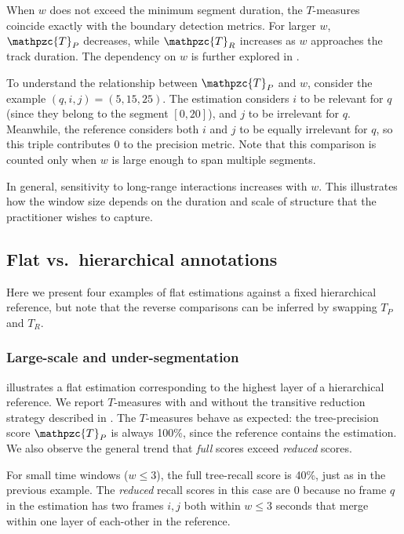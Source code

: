 \documentclass{article}
\def\shag{\ensuremath{\mathpzc{T}}}
\begin{document}
When $w$ does not exceed the minimum segment duration, the $T$-measures coincide
exactly with the boundary detection metrics.
For larger $w$, $\shag_P$ decreases, while $\shag_R$ increases as $w$ approaches the track
duration.
The dependency on $w$ is further explored in .

To understand the relationship between $\shag_P$ and $w$, consider the example 
$(q,i,j) = (5,15,25)$.
The estimation considers $i$ to be relevant for $q$ (since they belong to the segment $[0, 20]$), 
and $j$ to be irrelevant for $q$. Meanwhile, the reference considers both $i$
and $j$ to be equally irrelevant for $q$, so this triple contributes 0 to the precision
metric.
Note that this comparison is counted only when $w$ is large enough to span multiple
segments.

In general, sensitivity to long-range interactions increases with $w$.
This illustrates how the window size depends on the duration and scale of structure
that the practitioner wishes to capture.

\subsection{Flat vs.\ hierarchical annotations}

Here we present four examples of flat estimations against a fixed hierarchical reference, but note that the
reverse comparisons can be inferred by swapping $T_P$ and $T_R$.

\subsubsection{Large-scale and under-segmentation}
\label{sec:largeover}

 illustrates a flat estimation corresponding to the highest layer of 
a hierarchical reference.
We report $T$-measures with and without the transitive reduction strategy described in
.  The $T$-measures behave as expected: the tree-precision score
$\shag_P$ is always 100\%, since the reference contains the estimation.
We also observe the general trend that \emph{full} scores exceed 
\emph{reduced} scores.

For small time windows ($w \leq 3$), the full tree-recall score is 40\%, just as in the previous example.
The \emph{reduced} recall scores in this case are 0 because no frame $q$ in the
estimation has two frames $i, j$ both within $w \leq 3$ seconds that merge within one layer of each-other in the reference. 
\end{document}
